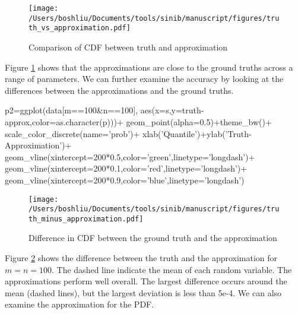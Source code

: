 \begin{figure}[h]
\texttt{[image: /Users/boshliu/Documents/tools/sinib/manuscript/figures/truth\_vs\_approximation.pdf]}
\caption{Comparison of CDF between truth and approximation}
\label{fig:1}
\end{figure}

Figure \ref{fig:1} shows that the approximations are close to the ground truths across a range of parameters. We can further examine the accuracy by looking at the differences between the approximations and the ground truths. 

\begin{example}
p2=ggplot(data[m==100&n==100],
	aes(x=s,y=truth-approx,color=as.character(p)))+
	geom_point(alpha=0.5)+theme_bw()+
	scale_color_discrete(name='prob')+
	xlab('Quantile')+ylab('Truth-Approximation')+
	geom_vline(xintercept=200*0.5,color='green',linetype='longdash')+
	geom_vline(xintercept=200*0.1,color='red',linetype='longdash')+
	geom_vline(xintercept=200*0.9,color='blue',linetype='longdash')
\end{example}

\begin{figure}[h]
\texttt{[image: /Users/boshliu/Documents/tools/sinib/manuscript/figures/truth\_minus\_approximation.pdf]}
\caption{Difference in CDF between the ground truth and the approximation}
\label{fig:2}
\end{figure}


Figure \ref{fig:2} shows the difference between the truth and the approximation for $m=n=100$. The dashed line indicate the mean of each random variable. The approximations perform well overall. The largest difference occurs around the mean (dashed lines), but the largest deviation is less than 5e-4. We can also examine the approximation for the PDF. 


